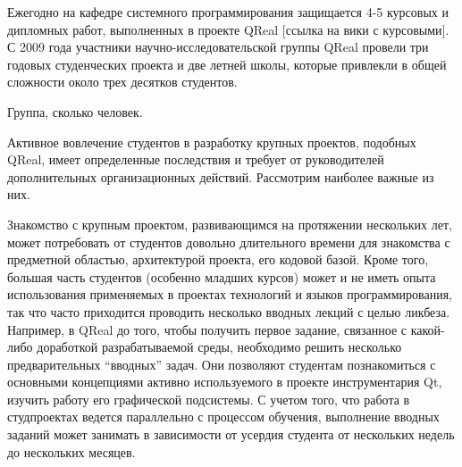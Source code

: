 \documentclass[a5paper]{article}
\begin{document}
Ежегодно на кафедре системного программирования защищается 4-5 курсовых и дипломных работ, выполненных в проекте QReal [ссылка на вики с курсовыми]. С 2009 года участники научно-исследовательской группы QReal провели три годовых студенческих проекта и две летней школы, которые привлекли в общей сложности около трех десятков студентов.

Группа, сколько человек. 

Активное вовлечение студентов в разработку крупных проектов, подобных QReal, имеет определенные последствия и требует от руководителей дополнительных организационных действий. Рассмотрим наиболее важные из них.

Знакомство с крупным проектом, развивающимся на протяжении нескольких лет, может потребовать от студентов довольно длительного времени для знакомства с предметной областью, архитектурой проекта, его кодовой базой. Кроме того, большая часть студентов (особенно младших курсов) может и не иметь опыта использования применяемых в проектах технологий и языков программирования, так что часто приходится проводить несколько вводных лекций с целью ликбеза. Например, в QReal до того, чтобы получить первое задание, связанное с какой-либо доработкой разрабатываемой среды, необходимо решить несколько предварительных ``вводных'' задач. Они позволяют студентам познакомиться с основными концепциями активно используемого в проекте инструментария Qt, изучить работу его графической подсистемы. С учетом того, что работа в студпроектах ведется параллельно с процессом обучения, выполнение вводных заданий может занимать в зависимости от усердия студента от нескольких недель до нескольких месяцев.
\end{document}
